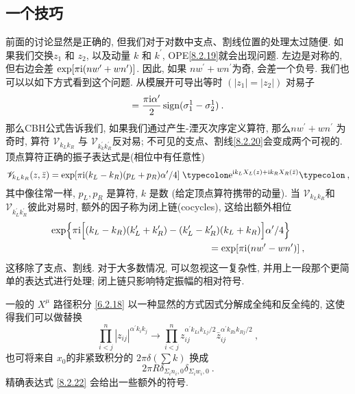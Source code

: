 \subsection*{一个技巧}

前面的讨论显然是正确的, 但我们对于对数中支点、割线位置的处理太过随便. 如果我们交换$z_{1}$ 和 $z_{2}$, 以及动量 $k$ 和 $k^{\prime} $, 
OPE\eqref{8.2.19}就会出现问题. 左边是对称的, 但右边会差 $\exp[\pi \mathrm{i}(n w^{\prime}+w n^{\prime})]$. 因此, 
如果 $n w^{\prime}+w n^{\prime}$为奇, 会差一个负号. 我们也可以以如下方式看到这个问题. 从模展开可导出等时 $(|z_{1}|=|z_{2}|)$ 对易子
\begin{equation}
	[X_{L}(z_{1}), X_{L}(z_{2})]=\frac{\pi \mi \alpha^{\prime}}{2} \operatorname{sign}(\sigma_{1}^{1}-\sigma_{2}^{1}) \:. \label{8.2.21}
\end{equation}
那么CBH公式告诉我们, 如果我们通过产生-湮灭次序定义算符, 那么$n w^{\prime}+w n^{\prime}$ 为奇时, 算符 $\mathscr{V}_{k_{L} k_{R}}$ 与 $\mathscr{V}_{k_{k}^{\prime} k_{R}^{\prime}}$反对易; 不可见的支点、割线\eqref{8.2.20}会变成两个可视的. 顶点算符正确的振子表达式是(相位中有任意性) 
\begin{equation}
	\mathscr{V}_{k_{L} k_{R}}(z, \bar{z})=\exp [\pi \mi(k_{L}-k_{R})(p_{L}+p_{R}) \alpha^{\prime} / 4] 
	\mathrel{\typecolon \me^{\mi k_{L} X_{L}(z)+\mi k_{R} X_{R}(\bar{z})} \typecolon} \:, \label{8.2.22}
\end{equation}
其中像往常一样,  $p_L,p_R$ 是算符, $k$ 是数 (给定顶点算符携带的动量). 
当 $\mathscr{V}_{k_{L} k_{R}}$和 $\mathscr{V}_{k_{L}^{\prime} k_{R}^{\prime}}$彼此对易时, 额外的因子称为闭上链(cocycles), 这给出额外相位
\begin{align}
	\exp \Bigl\{\pi \mathrm{i}\Bigl[(k_{L}-k_{R})(k_{L}^{\prime}+k_{R}^{\prime})-(k_{L}^{\prime}-k_{R}^{\prime})(k_{L}+k_{R})\Bigr] 
	\alpha^{\prime} / 4\Bigr\}\quad &  \nonumber \\
	=\exp [\pi \mathrm{i}(n w^{\prime}-w n^{\prime})] &\:, \label{8.2.23}
\end{align}
这移除了支点、割线. 对于大多数情况, 可以忽视这一复杂性, 并用上一段那个更简单的表达式进行处理; 闭上链只影响特定振幅的相对符号.

一般的 $X^{\mu}$ 路径积分 \eqref{6.2.18} 以一种显然的方式因式分解成全纯和反全纯的, 这使得我们可以做替换
\begin{equation}
	\prod_{i<j}^{n}|z_{i j}|^{\alpha^{\prime} k_{i} k_{j}} \to \prod_{i<j}^{n} z_{i j}^{\alpha^{\prime} k_{L i} k_{L j} / 2} 
	\bar{z}_{i j}^{\alpha^{\prime} k_{R i} k_{R j} / 2} \:, \label{8.2.24}
\end{equation}
也可将来自 $x_{0}$的非紧致积分的 $2 \pi \delta(\sum k)$ 换成
\begin{equation}
	2 \pi R \delta_{\Sigma_{i} n_{i}, 0} \delta_{\Sigma_{i} w_{i}, 0} \:. \label{8.2.25}
\end{equation}
精确表达式 \eqref{8.2.22} 会给出一些额外的符号.

